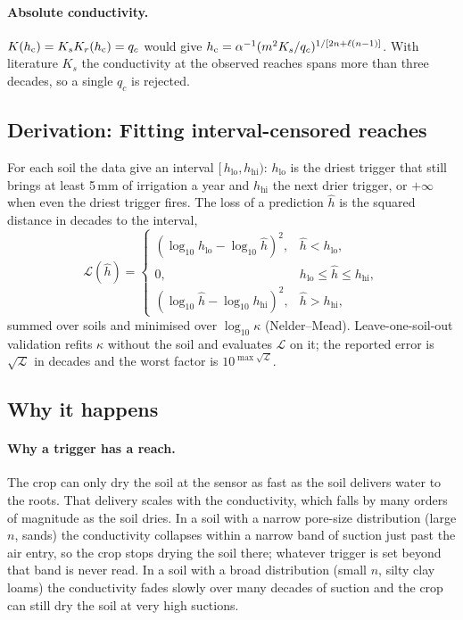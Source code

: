 \paragraph{Absolute conductivity.} $K(h_{\mathrm{c}})=K_s K_r(h_{\mathrm{c}})=q_c$ would give $h_{\mathrm{c}}=\alpha^{-1}(m^{2}K_s/q_c)^{1/[2n+\ell(n-1)]}$. With literature $K_s$ the conductivity at the observed reaches spans more than three decades, so a single $q_c$ is rejected.


\subsection{Derivation: Fitting interval-censored reaches}\label{der:s4:5}
For each soil the data give an interval $[\,h_{\mathrm{lo}},h_{\mathrm{hi}})$: $h_{\mathrm{lo}}$ is the driest trigger that still brings at least 5\,mm of irrigation a year and $h_{\mathrm{hi}}$ the next drier trigger, or $+\infty$ when even the driest trigger fires. The loss of a prediction $\hat h$ is the squared distance in decades to the interval,
\begin{equation}
\mathcal L(\hat h)=\begin{cases}(\log_{10}h_{\mathrm{lo}}-\log_{10}\hat h)^2, & \hat h<h_{\mathrm{lo}},\\ 0, & h_{\mathrm{lo}}\le\hat h\le h_{\mathrm{hi}},\\ (\log_{10}\hat h-\log_{10}h_{\mathrm{hi}})^2, & \hat h>h_{\mathrm{hi}},\end{cases}
\end{equation}
summed over soils and minimised over $\log_{10}\kappa$ (Nelder--Mead). Leave-one-soil-out validation refits $\kappa$ without the soil and evaluates $\mathcal L$ on it; the reported error is $\sqrt{\mathcal L}$ in decades and the worst factor is $10^{\max\sqrt{\mathcal L}}$.


\subsection{Why it happens}
\paragraph{Why a trigger has a reach.} The crop can only dry the soil at the sensor as fast as the soil delivers water to the roots. That delivery scales with the conductivity, which falls by many orders of magnitude as the soil dries. In a soil with a narrow pore-size distribution (large $n$, sands) the conductivity collapses within a narrow band of suction just past the air entry, so the crop stops drying the soil there; whatever trigger is set beyond that band is never read. In a soil with a broad distribution (small $n$, silty clay loams) the conductivity fades slowly over many decades of suction and the crop can still dry the soil at very high suctions.

